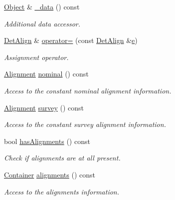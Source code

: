 \begin{DoxyCompactItemize}
\hyperlink{class_d_d4hep_1_1_alignments_1_1_det_align_ae49c039feb46ce85c64fecb6cf669f45}{Object} \& \hyperlink{class_d_d4hep_1_1_alignments_1_1_det_align_ab9e717eb37be61db43a980df0a91b57b}{\+\_\+data} () const
\begin{DoxyCompactList}\small\item\em Additional data accessor. \end{DoxyCompactList}\item 
\hyperlink{class_d_d4hep_1_1_alignments_1_1_det_align}{Det\+Align} \& \hyperlink{class_d_d4hep_1_1_alignments_1_1_det_align_a9672376d598c4e583163a1f46f7817d0}{operator=} (const \hyperlink{class_d_d4hep_1_1_alignments_1_1_det_align}{Det\+Align} \&\hyperlink{_volumes_8cpp_a8a9a1f93e9b09afccaec215310e64142}{e})
\begin{DoxyCompactList}\small\item\em Assignment operator. \end{DoxyCompactList}\item 
\hyperlink{class_d_d4hep_1_1_alignments_1_1_alignment}{Alignment} \hyperlink{class_d_d4hep_1_1_alignments_1_1_det_align_a950279ebf8f3870594b41e81b0b69db4}{nominal} () const
\begin{DoxyCompactList}\small\item\em Access to the constant nominal alignment information. \end{DoxyCompactList}\item 
\hyperlink{class_d_d4hep_1_1_alignments_1_1_alignment}{Alignment} \hyperlink{class_d_d4hep_1_1_alignments_1_1_det_align_a1d098023282ff8fd4829a5c39ba9d04a}{survey} () const
\begin{DoxyCompactList}\small\item\em Access to the constant survey alignment information. \end{DoxyCompactList}\item 
bool \hyperlink{class_d_d4hep_1_1_alignments_1_1_det_align_a8198a1f2a3da12d30afabb639b1194d8}{has\+Alignments} () const
\begin{DoxyCompactList}\small\item\em Check if alignments are at all present. \end{DoxyCompactList}\item 
\hyperlink{class_d_d4hep_1_1_alignments_1_1_container}{Container} \hyperlink{class_d_d4hep_1_1_alignments_1_1_det_align_ad89f0c712ae4b6cb78d2e92a30ac5742}{alignments} () const
\begin{DoxyCompactList}\small\item\em Access to the alignments information. \end{DoxyCompactList}\item 

\end{DoxyCompactItemize}
